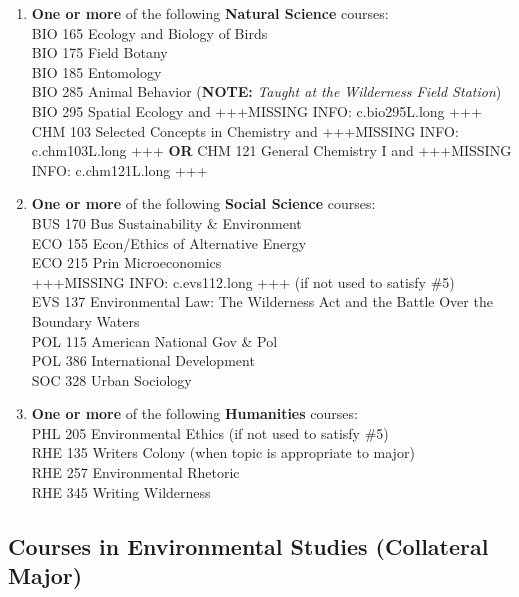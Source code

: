 \documentclass[
  letterpaper,
]{scrbook}
\providecommand{\tightlist}{%
  \setlength{\itemsep}{0pt}\setlength{\parskip}{0pt}}
\begin{document}
\begin{enumerate}
  \begin{enumerate}
  \def\labelenumii{\alph{enumii}.}
  \tightlist
  \item
    \textbf{One or more} of the following \textbf{Natural Science}
    courses:\\
    BIO 165 Ecology and Biology of Birds\\
    BIO 175 Field Botany\\
    BIO 185 Entomology\\
    BIO 285 Animal Behavior (\textbf{NOTE:} \emph{Taught at the
    Wilderness Field Station})\\
    BIO 295 Spatial Ecology and +++MISSING INFO: c.bio295L.long +++\\
    CHM 103 Selected Concepts in Chemistry and +++MISSING INFO:
    c.chm103L.long +++ \textbf{OR} CHM 121 General Chemistry I and
    +++MISSING INFO: c.chm121L.long +++\\
  \item
    \textbf{One or more} of the following \textbf{Social Science}
    courses:\\
    BUS 170 Bus Sustainability \& Environment\\
    ECO 155 Econ/Ethics of Alternative Energy\\
    ECO 215 Prin Microeconomics\\
    +++MISSING INFO: c.evs112.long +++ (if not used to satisfy \#5)\\
    EVS 137 Environmental Law: The Wilderness Act and the Battle Over
    the Boundary Waters\\
    POL 115 American National Gov \& Pol\\
    POL 386 International Development\\
    SOC 328 Urban Sociology\\
  \item
    \textbf{One or more} of the following \textbf{Humanities} courses:\\
    PHL 205 Environmental Ethics (if not used to satisfy \#5)\\
    RHE 135 Writers Colony (when topic is appropriate to major)\\
    RHE 257 Environmental Rhetoric\\
    RHE 345 Writing Wilderness
  \end{enumerate}
\end{enumerate}

\subsection{Courses in Environmental Studies (Collateral
Major)}\label{courses-in-environmental-studies-collateral-major}
\end{document}

